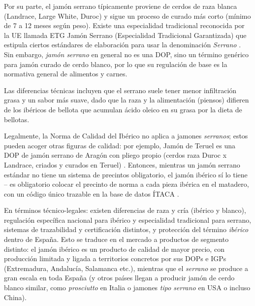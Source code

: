 Por su parte, el jamón serrano típicamente proviene de cerdos de raza blanca (Landrace, Large White, Duroc) y sigue un proceso de curado más corto (mínimo de 7 a 12 meses según peso). Existe una especialidad tradicional reconocida por la UE llamada ETG Jamón Serrano (Especialidad Tradicional Garantizada) que estipula ciertos estándares de elaboración para usar la denominación \textit{Serrano} \cite{noauthor_etg_nodate}. Sin embargo, \textit{jamón serrano} en general no es una DOP, sino un término genérico para jamón curado de cerdo blanco, por lo que su regulación de base es la normativa general de alimentos y carnes.

Las diferencias técnicas incluyen que el serrano suele tener menor infiltración grasa y un sabor más suave, dado que la raza y la alimentación (piensos) difieren de los ibéricos de bellota que acumulan ácido oleico en su grasa por la dieta de bellotas.

Legalmente, la Norma de Calidad del Ibérico no aplica a jamones \textit{serranos}; estos pueden acoger otras figuras de calidad: por ejemplo, Jamón de Teruel es una DOP de jamón serrano de Aragón con pliego propio (cerdos raza Duroc x Landrace, criados y curados en Teruel) \cite{ministerio_de_agricultura_pesca_y_alimentacion_espana_pliego_2022-1}. Entonces, mientras un jamón serrano estándar no tiene un sistema de precintos obligatorio, el jamón ibérico sí lo tiene – es obligatorio colocar el precinto de norma a cada pieza ibérica en el matadero, con un código único trazable en la base de datos ÍTACA \cite{noauthor_sistema_nodate}.

En términos técnico-legales: existen diferencias de raza y cría (ibérico y blanco), regulación específica nacional para ibérico y especialidad tradicional para serrano, sistemas de trazabilidad y certificación distintos, y protección del término \textit{ibérico} dentro de España. Esto se traduce en el mercado a productos de segmento distinto: el jamón ibérico es un producto de calidad de mayor precio, con producción limitada y ligada a territorios concretos por sus DOPs e IGPs (Extremadura, Andalucía, Salamanca etc.), mientras que el \textit{serrano} se produce a gran escala en toda España (y otros países llegan a producir jamón de cerdo blanco similar, como \textit{prosciutto} en Italia o jamones \textit{tipo serrano} en USA o incluso China).

